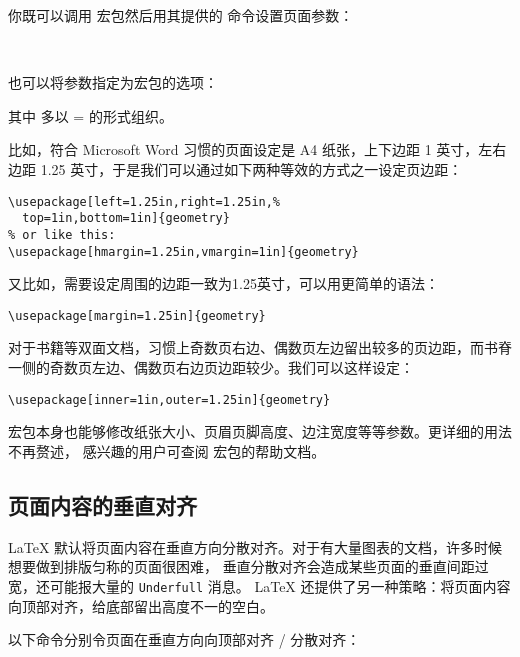 你既可以调用  宏包然后用其提供的  命令设置页面参数：
\begin{command}
 \\
\end{command}

也可以将参数指定为宏包的选项：
\begin{command}
\end{command}

其中  多以 = 的形式组织。

比如，符合 Microsoft Word 习惯的页面设定是 A4 纸张，上下边距 1 英寸，左右边距 1.25 英寸，于是我们可以通过如下两种等效的方式之一设定页边距：
\begin{verbatim}
\usepackage[left=1.25in,right=1.25in,%
  top=1in,bottom=1in]{geometry}
% or like this:
\usepackage[hmargin=1.25in,vmargin=1in]{geometry}
\end{verbatim}

又比如，需要设定周围的边距一致为1.25英寸，可以用更简单的语法：
\begin{verbatim}
\usepackage[margin=1.25in]{geometry}
\end{verbatim}

对于书籍等双面文档，习惯上奇数页右边、偶数页左边留出较多的页边距，而书脊一侧的奇数页左边、偶数页右边页边距较少。我们可以这样设定：
\begin{verbatim}
\usepackage[inner=1in,outer=1.25in]{geometry}
\end{verbatim}

 宏包本身也能够修改纸张大小、页眉页脚高度、边注宽度等等参数。更详细的用法不再赘述，
感兴趣的用户可查阅  宏包的帮助文档。

\subsection{页面内容的垂直对齐}\label{subsec:raggedbottom}

\LaTeX{} 默认将页面内容在垂直方向分散对齐。对于有大量图表的文档，许多时候想要做到排版匀称的页面很困难，
垂直分散对齐会造成某些页面的垂直间距过宽，还可能报大量的 \texttt{Underfull}  消息。
\LaTeX{} 还提供了另一种策略：将页面内容向顶部对齐，给底部留出高度不一的空白。

以下命令分别令页面在垂直方向向顶部对齐 / 分散对齐：
\begin{command}
 \\
\end{command}

